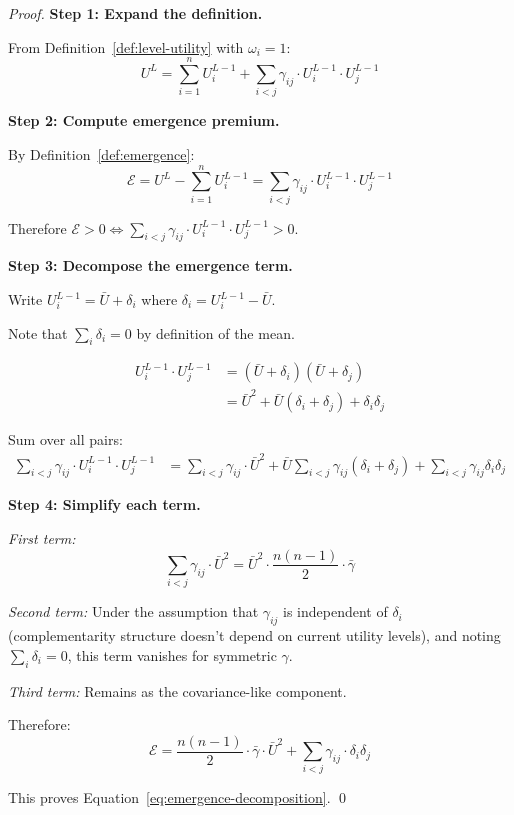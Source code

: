 \begin{proof}
\textbf{Step 1: Expand the definition.}

From Definition~\ref{def:level-utility} with $\omega_i = 1$:
\begin{equation}
U^L = \sum_{i=1}^{n} U^{L-1}_i + \sum_{i<j} \gamma_{ij} \cdot U^{L-1}_i \cdot U^{L-1}_j
\end{equation}

\textbf{Step 2: Compute emergence premium.}

By Definition~\ref{def:emergence}:
\begin{equation}
\mathcal{E} = U^L - \sum_{i=1}^{n} U^{L-1}_i = \sum_{i<j} \gamma_{ij} \cdot U^{L-1}_i \cdot U^{L-1}_j
\end{equation}

Therefore $\mathcal{E} > 0 \Leftrightarrow \sum_{i<j} \gamma_{ij} \cdot U^{L-1}_i \cdot U^{L-1}_j > 0$. \checkmark

\textbf{Step 3: Decompose the emergence term.}

Write $U^{L-1}_i = \bar{U} + \delta_i$ where $\delta_i = U^{L-1}_i - \bar{U}$.

Note that $\sum_i \delta_i = 0$ by definition of the mean.

\begin{align}
U^{L-1}_i \cdot U^{L-1}_j &= (\bar{U} + \delta_i)(\bar{U} + \delta_j) \\
&= \bar{U}^2 + \bar{U}(\delta_i + \delta_j) + \delta_i \delta_j
\end{align}

Sum over all pairs:
\begin{align}
\sum_{i<j} \gamma_{ij} \cdot U^{L-1}_i \cdot U^{L-1}_j &=
\sum_{i<j} \gamma_{ij} \cdot \bar{U}^2 +
\bar{U} \sum_{i<j} \gamma_{ij} (\delta_i + \delta_j) +
\sum_{i<j} \gamma_{ij} \delta_i \delta_j
\end{align}

\textbf{Step 4: Simplify each term.}

\textit{First term:}
\begin{equation}
\sum_{i<j} \gamma_{ij} \cdot \bar{U}^2 = \bar{U}^2 \cdot \frac{n(n-1)}{2} \cdot \bar{\gamma}
\end{equation}

\textit{Second term:} Under the assumption that $\gamma_{ij}$ is independent of $\delta_i$
(complementarity structure doesn't depend on current utility levels), and noting
$\sum_i \delta_i = 0$, this term vanishes for symmetric $\gamma$.

\textit{Third term:} Remains as the covariance-like component.

Therefore:
\begin{equation}
\mathcal{E} = \frac{n(n-1)}{2} \cdot \bar{\gamma} \cdot \bar{U}^2 + \sum_{i<j} \gamma_{ij} \cdot \delta_i \delta_j
\end{equation}

This proves Equation~\ref{eq:emergence-decomposition}. \qed
\end{proof}


